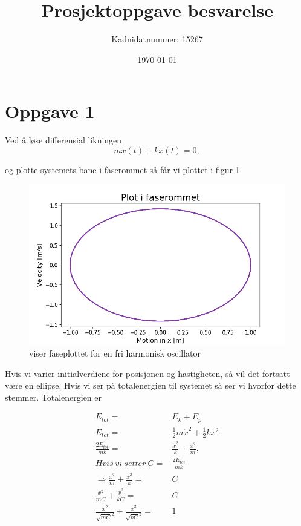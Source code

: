 \documentclass[norsk,a4paper,12pt]{article}
\title{Prosjektoppgave besvarelse}
\author{Kadnidatnummer: 15267}
\date{\today}
\begin{document}
\maketitle


\section*{Oppgave 1}

Ved å løse differensial likningen
\\

\begin{equation}
	m\ddot{x}(t) + kx(t) =0,
\end{equation}

og plotte systemets bane i faserommet så får vi plottet i figur \ref{fig:plotoppg1}
\\
\begin{figure}[h]
\begin{center}
\includegraphics[scale=0.5]{Oppgave1fase.png}
\caption{viser faseplottet for en fri harmonisk oscillator}
\label{fig:plotoppg1}
\end{center}
\end{figure}

Hvis vi varier initialverdiene for posisjonen og hastigheten, så vil det fortsatt være en ellipse. Hvis vi ser på totalenergien til systemet så ser vi hvorfor dette stemmer. Totalenergien er 

\begin{align*}
	E_{tot} =& E_k + E_p\\
	E_{tot} =& \frac{1}{2}m\dot{x}^2 + \frac{1}{2}kx^2\\
	\frac{2E_{tot}}{mk} =& \frac{\dot{x}^2}{k} + \frac{x^2}{m},\\
	Hvis\ vi\ setter\ C =& \frac{2E_{tot}}{mk}\\
	\Rightarrow \frac{x^2}{m} + \frac{\dot{x}^2}{k} =& C \\
	\frac{x^2}{mC} + \frac{\dot{x}^2}{kC} =& C \\
	\frac{x^2}{\sqrt{mC}^2} + \frac{\dot{x}^2}{\sqrt{kC}^2} =& 1 \\
\end{align*}
\end{document}
